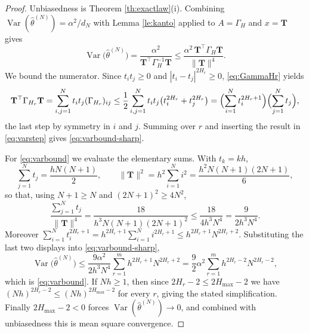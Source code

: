 \documentclass[11pt,reqno]{amsart}
\numberwithin{equation}{section}
\theoremstyle{plain}
\theoremstyle{definition}
\theoremstyle{remark}
\newcommand{\bT}{\mathbf{T}}
\newcommand{\GH}{\Gamma_H}
\newcommand{\Hmax}{H_{\max}}
\DeclareMathOperator{\Var}{Var}
\begin{document}
\begin{proof}
Unbiasedness is Theorem \ref{th:exactlaw}(i). Combining
$\Var(\widehat\theta^{(N)})=\alpha^{2}/d_N$ with Lemma \ref{le:kanto} applied to
$A=\GH$ and $x=\bT$ gives
\begin{equation}\label{eq:varstep}
  \Var\bigl(\widehat\theta^{(N)}\bigr)=\frac{\alpha^{2}}{\bT^{\top}\GH^{-1}\bT}
  \le\frac{\alpha^{2}\,\bT^{\top}\GH\bT}{\|\bT\|^{4}} .
\end{equation}
We bound the numerator. Since $t_it_j\ge0$ and $|t_i-t_j|^{2H_r}\ge0$,
\eqref{eq:GammaHr} yields
\[
  \bT^{\top}\Gamma_{H_r}\bT=\sum_{i,j=1}^{N}t_it_j(\Gamma_{H_r})_{ij}
  \le\frac12\sum_{i,j=1}^{N}t_it_j\bigl(t_i^{2H_r}+t_j^{2H_r}\bigr)
  =\Bigl(\sum_{i=1}^{N}t_i^{2H_r+1}\Bigr)\Bigl(\sum_{j=1}^{N}t_j\Bigr),
\]
the last step by symmetry in $i$ and $j$. Summing over $r$ and inserting the result in
\eqref{eq:varstep} gives \eqref{eq:varbound-sharp}.

For \eqref{eq:varbound} we evaluate the elementary sums. With $t_k=kh$,
\[
  \sum_{j=1}^{N}t_j=\frac{hN(N+1)}{2},\qquad
  \|\bT\|^{2}=h^{2}\sum_{i=1}^{N}i^{2}=\frac{h^{2}N(N+1)(2N+1)}{6},
\]
so that, using $N+1\ge N$ and $(2N+1)^{2}\ge4N^{2}$,
\[
  \frac{\sum_{j=1}^{N}t_j}{\|\bT\|^{4}}
  =\frac{18}{h^{3}N(N+1)(2N+1)^{2}}\le\frac{18}{4h^{3}N^{4}}=\frac{9}{2h^{3}N^{4}} .
\]
Moreover $\sum_{i=1}^{N}t_i^{2H_r+1}=h^{2H_r+1}\sum_{i=1}^{N}i^{2H_r+1}
\le h^{2H_r+1}N^{2H_r+2}$. Substituting the last two displays into
\eqref{eq:varbound-sharp},
\[
  \Var\bigl(\widehat\theta^{(N)}\bigr)
  \le\frac{9\alpha^{2}}{2h^{3}N^{4}}\sum_{r=1}^{m}h^{2H_r+1}N^{2H_r+2}
  =\frac92\alpha^{2}\sum_{r=1}^{m}h^{2H_r-2}N^{2H_r-2},
\]
which is \eqref{eq:varbound}. If $Nh\ge1$, then since $2H_r-2\le2\Hmax-2$ we have
$(Nh)^{2H_r-2}\le(Nh)^{2\Hmax-2}$ for every $r$, giving the stated simplification.
Finally $2\Hmax-2<0$ forces $\Var(\widehat\theta^{(N)})\to0$, and combined with
unbiasedness this is mean square convergence.
\end{proof}
\end{document}
